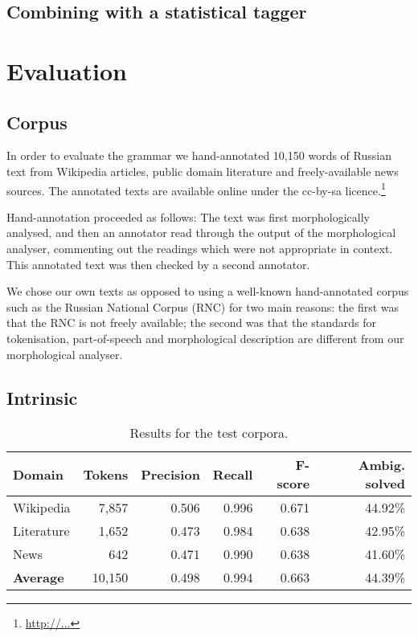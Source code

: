 \documentclass[11pt]{article}
\begin{document}
\subsection{Combining with a statistical tagger}

\section{Evaluation}

\subsection{Corpus}

In order to evaluate the grammar we hand-annotated 10,150 words of Russian text
from Wikipedia articles, public domain literature and freely-available news sources. The
annotated texts are available online under the {\sc cc-by-sa} licence.\footnote{\url{http://...}}

Hand-annotation proceeded as follows: The text was first morphologically analysed, 
and then an annotator read through the output of the morphological analyser, commenting
out the readings which were not appropriate in context. This annotated text was then checked
by a second annotator.

We chose our own texts as opposed to using a well-known hand-annotated corpus
such as the Russian National Corpus (RNC) for two main reasons: the first was that the 
RNC is not freely available; the second was that the standards for tokenisation, part-of-speech
and morphological description are different from our morphological analyser.

\subsection{Intrinsic}

\begin{table*}
  \centering
  \begin{tabular}{|l|r|r|r|r|r|}
    \hline
    \textbf{Domain} & \textbf{Tokens} & \textbf{Precision} & \textbf{Recall} & \textbf{F-score} & \textbf{Ambig. solved} \\
    \hline
    Wikipedia       & 7,857      & 0.506        & 0.996    & 0.671 & 44.92\%  \\
    Literature      & 1,652      & 0.473        & 0.984    & 0.638 & 42.95\%  \\
    News            & 642        & 0.471        & 0.990    & 0.638 & 41.60\%  \\
    \hline
    \textbf{Average}& 10,150     & 0.498        &  0.994   & 0.663 & 44.39\% \\
    \hline
  \end{tabular}
  \caption{Results for the test corpora.}
\end{table*}
\end{document}
